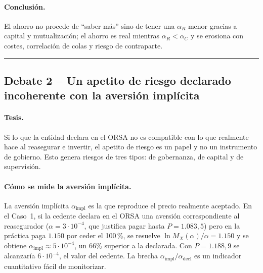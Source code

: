 \documentclass[a4paper,12pt]{article}
\begin{document}
\paragraph{Conclusi\'on.} El ahorro no procede de ``saber m\'as'' sino de tener una $\alpha_R$ menor gracias a capital y mutualizaci\'on; el ahorro es real mientras $\alpha_R<\alpha_C$ y se erosiona con costes, correlaci\'on de colas y riesgo de contraparte.

\bigskip\hrule\bigskip

\subsection{Debate 2 -- Un apetito de riesgo declarado incoherente con la aversi\'on impl\'icita}

\paragraph{Tesis.} Si lo que la entidad declara en el ORSA no es compatible con lo que realmente hace al reasegurar e invertir, el apetito de riesgo es un papel y no un instrumento de gobierno. Esto genera riesgos de tres tipos: de gobernanza, de capital y de supervisi\'on.

\paragraph{C\'omo se mide la aversi\'on impl\'icita.} La aversi\'on impl\'icita $\alpha_{\text{impl}}$ es la que reproduce el precio realmente aceptado. En el Caso~1, si la cedente declara en el ORSA una aversi\'on correspondiente al reasegurador ($\alpha=3\cdot10^{-4}$, que justifica pagar hasta $P=1.083{,}5$) pero en la pr\'actica paga $1.150$ por ceder el 100\,\%, se resuelve $\ln M_X(\alpha)/\alpha=1.150$ y se obtiene $\alpha_{\text{impl}}\approx5\cdot10^{-4}$, un $66\%$ superior a la declarada. Con $P=1.188{,}9$ se alcanzar\'ia $6\cdot10^{-4}$, el valor del cedente. La brecha $\alpha_{\text{impl}}/\alpha_{\text{decl}}$ es un indicador cuantitativo f\'acil de monitorizar.
\end{document}
